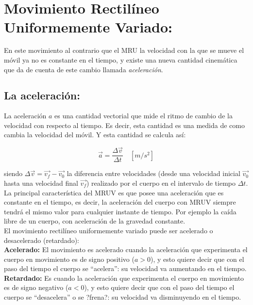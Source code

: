 \documentclass[a5paper,pagesize,10pt,bibtotoc,pointlessnumbers,
normalheadings,DIV=9,fleqn,x11names,table,twoside=false]{scrbook}
\begin{document}
\section{Movimiento Rectilíneo Uniformemente Variado:}
 
En este movimiento al contrario que el MRU la velocidad con la que se mueve el móvil ya no es constante en el tiempo, y existe 
una nueva cantidad cinemática que da de cuenta de este cambio llamada \textit{aceleración}. 

\subsection{La aceleración:}

La aceleración $a$ es una cantidad vectorial que mide el ritmo de cambio de la velocidad con respecto al tiempo. Es decir, esta 
cantidad es una medida de como cambia la velocidad del móvil. Y esta cantidad se calcula así:

\begin{equation}
 \vec{a}=\frac{\Delta \vec{v}}{\Delta t}\quad [m/s^2] 
 \end{equation}
 
siendo $\Delta \vec{v}=\vec{v_f}-\vec{v_0}$ la diferencia entre velocidades (desde una velocidad inicial $\vec{v_0}$ hasta una 
velocidad final $\vec{v_f}$) realizado por el cuerpo en el intervalo de tiempo $\Delta t$.\\

La principal característica del MRUV es que posee una aceleración que es constante en el tiempo, es decir, la aceleración del 
cuerpo con MRUV siempre tendrá el mismo valor para cualquier instante de tiempo. Por ejemplo la caída libre de un cuerpo, con 
aceleración de la gravedad constante.\\

El movimiento rectilíneo uniformemente variado puede ser acelerado o desacelerado (retardado):\\

\textbf{Acelerado:} El movimiento es acelerado cuando la aceleración que experimenta el cuerpo en movimiento es de signo positivo 
($a > 0$), y esto quiere decir que con el paso del tiempo el cuerpo se ``acelera'': su velocidad va aumentando en el tiempo.\\

\textbf{Retardado:} Es cuando la aceleración que experimenta el cuerpo en movimiento es de signo negativo ($a < 0$), y esto 
quiere decir que con el paso del tiempo el cuerpo se ``desacelera'' o se ?frena?: su velocidad va disminuyendo en el tiempo.\\
\end{document}

